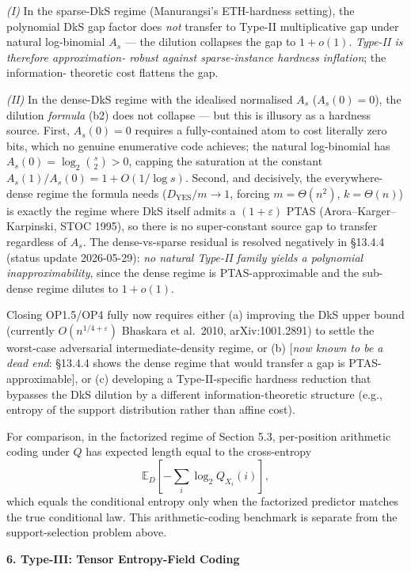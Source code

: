 \documentclass[
]{article}
\begin{document}
\emph{(I)} In the sparse-DkS regime (Manurangsi's ETH-hardness setting),
the polynomial DkS gap factor does \emph{not} transfer to Type-II
multiplicative gap under natural log-binomial $A_s$ --- the dilution
collapses the gap to $1 + o(1)$. \emph{Type-II is therefore approximation-
robust against sparse-instance hardness inflation}; the information-
theoretic cost flattens the gap.

\emph{(II)} In the dense-DkS regime with the idealised normalised $A_s$
($A_s(0) = 0$), the dilution \emph{formula} (b2) does not collapse --- but
this is illusory as a hardness source. First, $A_s(0) = 0$ requires a
fully-contained atom to cost literally zero bits, which no genuine
enumerative code achieves; the natural log-binomial has $A_s(0) = \log_2
\binom{s}{2} > 0$, capping the saturation at the constant $A_s(1)/A_s(0) = 1
+ O(1/\log s)$. Second, and decisively, the everywhere-dense regime the
formula needs ($D_{\mathrm{YES}}/m \to 1$, forcing $m = \Theta(n^2)$, $k =
\Theta(n)$) is exactly the regime where DkS itself admits a $(1+\varepsilon)$
PTAS (Arora--Karger--Karpinski, STOC 1995), so there is no super-constant
source gap to transfer regardless of $A_s$. The dense-vs-sparse residual is
resolved negatively in \S13.4.4 (status update 2026-05-29): \emph{no natural
Type-II family yields a polynomial inapproximability}, since the dense
regime is PTAS-approximable and the sub-dense regime dilutes to $1 + o(1)$.

Closing OP1.5/OP4 fully now requires either (a) improving the DkS upper
bound (currently $O(n^{1/4 + \varepsilon})$ Bhaskara et al.\ 2010,
arXiv:1001.2891) to settle the worst-case adversarial intermediate-density
regime, or (b) [\emph{now known to be a dead end}: \S13.4.4 shows the dense
regime that would transfer a gap is PTAS-approximable], or (c) developing a
Type-II-specific hardness reduction that bypasses the DkS dilution by a
different information-theoretic structure (e.g., entropy of the support
distribution rather than affine cost).

For comparison, in the factorized regime of Section 5.3, per-position
arithmetic coding under $Q$ has expected length equal to the
cross-entropy
\[
\mathbb{E}_D \!\left[-\sum_i \log_2 Q_{X_i}(i)\right],
\]
which equals the conditional entropy only when the factorized
predictor matches the true conditional law. This arithmetic-coding
benchmark is separate from the support-selection problem above.

\textbf{6. Type-III: Tensor Entropy-Field Coding}
\end{document}

